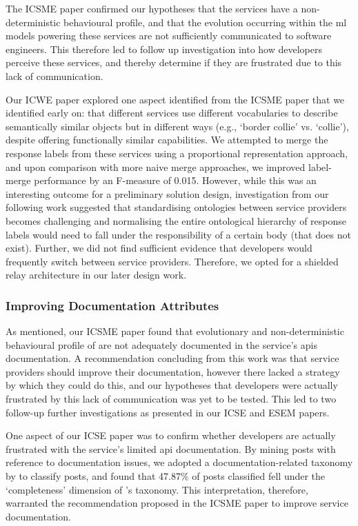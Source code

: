 The ICSME paper confirmed our hypotheses that the services have a non-deterministic behavioural profile, and that the evolution occurring within the \gls{ml} models powering these services are not sufficiently communicated to software engineers. This therefore led to follow up investigation into how developers perceive these services, and thereby determine if they are frustrated due to this lack of communication. 

Our ICWE paper explored one aspect identified from the ICSME paper that we identified early on: that different services use different vocabularies to describe semantically similar objects but in different ways (e.g., `border collie' vs. `collie'), despite offering functionally similar capabilities. We attempted to merge the response labels from these services using a proportional representation approach, and upon comparison with more naive merge approaches, we improved label-merge performance by an F-measure of 0.015. However, while this was an interesting outcome for a preliminary solution design, investigation from our following work suggested that standardising ontologies between service providers becomes challenging and normalising the entire ontological hierarchy of response labels would need to fall under the responsibility of a certain body (that does not exist). Further, we did not find sufficient evidence that developers would frequently switch between service providers. Therefore, we opted for a shielded relay architecture in our later design work.  

\subsubsection{Improving Documentation Attributes}

As mentioned, our ICSME paper found that evolutionary and non-deterministic behavioural profile of are not adequately documented in the service's \glspl{api} documentation. A recommendation concluding from this work was that service providers should improve their documentation, however there lacked a strategy by which they could do this, and our hypotheses that developers were actually frustrated by this lack of communication was yet to be tested. This led to two follow-up further investigations as presented in our ICSE and ESEM papers.

One aspect of our ICSE paper was to confirm whether developers are actually frustrated with the service's limited \gls{api} documentation. By mining  posts with reference to documentation issues, we adopted a \citeyear{Aghajani:2019bo} documentation-related taxonomy by \citet{Aghajani:2018et} to classify posts, and found that 47.87\% of posts classified fell under the `completeness' dimension of \citeauthor{Aghajani:2018et}'s taxonomy. This interpretation, therefore, warranted the recommendation proposed in the ICSME paper to improve service documentation. 

